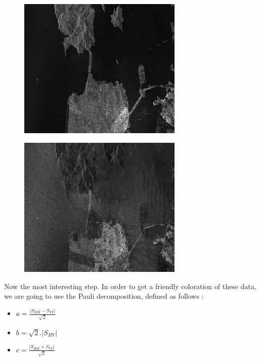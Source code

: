 \begin{figure}[!h]
\center
\includegraphics[width=0.7\textwidth]{../Art/RSAT2_HV_Frisco.png}
\label{fig:hvfrisco}
\end{figure}

\begin{figure}[!h]
\center
\includegraphics[width=0.7\textwidth]{../Art/RSAT2_VV_Frisco.png}
\label{fig:vvfrisco}
\end{figure}

Now the most interesting step. In order to get a friendly coloration of these
data, we are going to use the Pauli decomposition, defined as follows :

\begin{itemize}
\item  $a=\frac{|S_{HH}-S_{VV}|}{\sqrt{2}}$ 
									  
\item  $b=\sqrt{2}.|S_{HV}|$ 
									  
\item  $c=\frac{|S_{HH}+S_{VV}|}{\sqrt{2}}$ 
\end{itemize}

